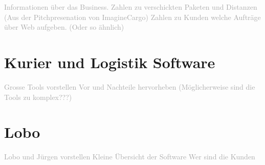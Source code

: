 \textcolor{darkgray}{
  Informationen über das Business.
  Zahlen zu verschickten Paketen und Distanzen (Aus der Pitchpresenation von ImagineCargo)
  Zahlen zu Kunden welche Aufträge über Web aufgeben. (Oder so ähnlich)
}


\section{Kurier und Logistik Software}
\textcolor{darkgray}{
  Grosse Tools vorstellen
  Vor und Nachteile hervorheben
  (Möglicherweise sind die Tools zu komplex???)
}


\section{Lobo}
\textcolor{darkgray}{
  Lobo und Jürgen vorstellen
  Kleine Übersicht der Software
  Wer sind die Kunden
}